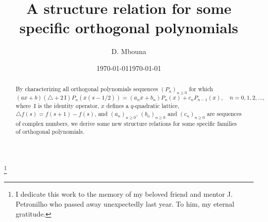 \documentclass{amsart}
\theoremstyle{remark}
\numberwithin{equation}{section}
\begin{document}
\title[Orthogonal polynomials related with the Askey-Wilson operator]
{A structure relation for some specific orthogonal polynomials}
\author{D. Mbouna}
\address{University of Almer\'ia, Department of Mathematics, Almer\'ia, Spain}




\date{\today}


\thanks{I dedicate this work to the memory of my beloved friend and mentor J. Petronilho who passed away unexpectedly last year. To him, my eternal gratitude.}


\date{\today}


\maketitle




\begin{abstract}
By characterizing all orthogonal polynomials sequences $(P_n)_{n\geq 0}$ for which
$$
(ax+b)(\triangle +2\,\mathrm{I})P_n(x(s-1/2))=(a_n x+b_n)P_n(x)+c_n P_{n-1}(x),\quad n=0,1,2,\dots,
$$
where $\,\mathrm{I}$ is the identity operator, $x$ defines a $q$-quadratic lattice, $\triangle f(s)=f(s+1)-f(s)$, and $(a_n)_{n\geq0}$, $(b_n)_{n\geq0}$ and $(c_n)_{n\geq0}$ are sequences of complex numbers, we derive some new structure relations for some specific families of orthogonal polynomials.
\end{abstract}
\end{document}
